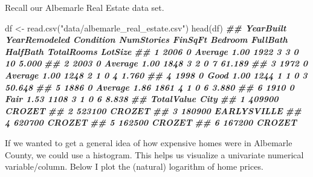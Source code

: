 \documentclass[
  12pt,
]{krantz}
\makeatletter
\newenvironment{Shaded}{\begin{snugshade}}{\end{snugshade}}
\newcommand{\AttributeTok}[1]{\textcolor[rgb]{0.61,0.61,0.61}{#1}}
\newcommand{\DocumentationTok}[1]{\textcolor[rgb]{0.37,0.37,0.37}{\textbf{\textit{#1}}}}
\newcommand{\FunctionTok}[1]{\textcolor[rgb]{0,0,0}{#1}}
\newcommand{\NormalTok}[1]{#1}
\newcommand{\OtherTok}[1]{\textcolor[rgb]{0.37,0.37,0.37}{#1}}
\newcommand{\SpecialCharTok}[1]{\textcolor[rgb]{0,0,0}{#1}}
\newcommand{\StringTok}[1]{\textcolor[rgb]{0.5,0.5,0.5}{#1}}
\newenvironment{kframe}{%
\medskip{}
\setlength{\fboxsep}{.8em}
 \def\at@end@of@kframe{}%
 \ifinner\ifhmode%
  \def\at@end@of@kframe{\end{minipage}}%
  \begin{minipage}{\columnwidth}%
 \fi\fi%
 \def\FrameCommand##1{\hskip\@totalleftmargin \hskip-\fboxsep
 \colorbox{shadecolor}{##1}\hskip-\fboxsep
     \hskip-\linewidth \hskip-\@totalleftmargin \hskip\columnwidth}%
 \MakeFramed {\advance\hsize-\width
   \@totalleftmargin\z@ \linewidth\hsize
   \@setminipage}}%
 {\par\unskip\endMakeFramed%
 \at@end@of@kframe}
\renewenvironment{Shaded}{\begin{kframe}}{\end{kframe}}
\makeatother
\begin{document}
Recall our Albemarle Real Estate data set.

\begin{Shaded}
\begin{Highlighting}[]
\NormalTok{df }\OtherTok{\textless{}{-}} \FunctionTok{read.csv}\NormalTok{(}\StringTok{"data/albemarle\_real\_estate.csv"}\NormalTok{)}
\FunctionTok{head}\NormalTok{(df)}
\DocumentationTok{\#\#   YearBuilt YearRemodeled Condition NumStories FinSqFt Bedroom FullBath HalfBath TotalRooms LotSize}
\DocumentationTok{\#\# 1      2006             0   Average       1.00    1922       3        3        0         10   5.000}
\DocumentationTok{\#\# 2      2003             0   Average       1.00    1848       3        2        0          7  61.189}
\DocumentationTok{\#\# 3      1972             0   Average       1.00    1248       2        1        0          4   1.760}
\DocumentationTok{\#\# 4      1998             0      Good       1.00    1244       1        1        0          3  50.648}
\DocumentationTok{\#\# 5      1886             0   Average       1.86    1861       4        1        0          6   3.880}
\DocumentationTok{\#\# 6      1910             0      Fair       1.53    1108       3        1        0          6   8.838}
\DocumentationTok{\#\#   TotalValue        City}
\DocumentationTok{\#\# 1     409900      CROZET}
\DocumentationTok{\#\# 2     523100      CROZET}
\DocumentationTok{\#\# 3     180900 EARLYSVILLE}
\DocumentationTok{\#\# 4     620700      CROZET}
\DocumentationTok{\#\# 5     162500      CROZET}
\DocumentationTok{\#\# 6     167200      CROZET}
\end{Highlighting}
\end{Shaded}

If we wanted to get a general idea of how expensive homes were in Albemarle County, we could use a histogram. This helps us visualize a univariate numerical variable/column. Below I plot the (natural) logarithm of home prices.

\begin{Shaded}
\end{Shaded}
\end{document}
